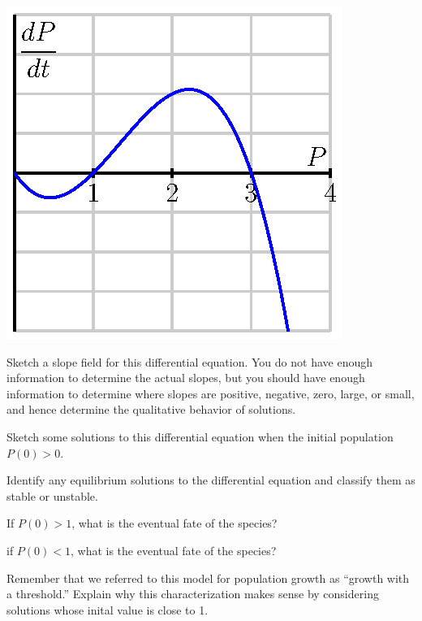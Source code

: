 \begin{exercises}
    \begin{center}
      \includegraphics{figures/7_1_threshold.eps}
    \end{center}

    \ba
    \item  Sketch a slope field for this differential equation.  You do
    not have enough information to determine the actual slopes, but
    you should have enough information to determine where slopes are positive, negative, zero, large, or small, and hence determine the qualitative
    behavior of solutions.

    \item Sketch some solutions to this differential equation when the
    initial population $P(0)>0$.

    \item  Identify any equilibrium solutions to the differential equation and classify them as stable
    or unstable.

    \item  If $P(0)>1$, what is the eventual fate of the species?

    \item  if $P(0)<1$, what is the eventual fate of the species?

    \item  Remember that we referred to this model for population growth
    as ``growth with a threshold.''  Explain why this characterization makes sense by considering
    solutions whose inital value is close to 1.  
	\ea
	

\end{exercises}
